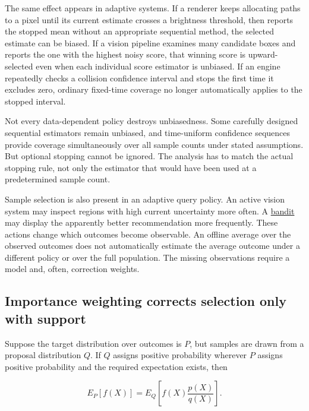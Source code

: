 The same effect appears in adaptive systems. If a renderer keeps allocating paths to a pixel until its current estimate crosses a brightness threshold, then reports the stopped mean without an appropriate sequential method, the selected estimate can be biased. If a vision pipeline examines many candidate boxes and reports the one with the highest noisy score, that winning score is upward-selected even when each individual score estimator is unbiased. If an engine repeatedly checks a collision confidence interval and stops the first time it excludes zero, ordinary fixed-time coverage no longer automatically applies to the stopped interval.

Not every data-dependent policy destroys unbiasedness. Some carefully designed sequential estimators remain unbiased, and time-uniform confidence sequences provide coverage simultaneously over all sample counts under stated assumptions. But optional stopping cannot be ignored. The analysis has to match the actual stopping rule, not only the estimator that would have been used at a predetermined sample count.

Sample selection is also present in an adaptive query policy. An active vision system may inspect regions with high current uncertainty more often. A \hyperref[appendix-3dc863dbddf3]{bandit} may display the apparently better recommendation more frequently. These actions change which outcomes become observable. An offline average over the observed outcomes does not automatically estimate the average outcome under a different policy or over the full population. The missing observations require a model and, often, correction weights.

\subsection{Importance weighting corrects selection only with support}\label{03-visual-computing-i-ch012-importance-weighting-corrects-selection-only-with-support}

\hypertarget{03-visual-computing-i-ch012-importance-weighting-corrects-selection-only-with-support}{}

Suppose the target distribution over outcomes is \(P\), but samples are drawn from a proposal distribution \(Q\). If \(Q\) assigns positive probability wherever \(P\) assigns positive probability and the required expectation exists, then

\[
E_P[f(X)]=E_Q\left[f(X)\frac{p(X)}{q(X)}\right].
\]

